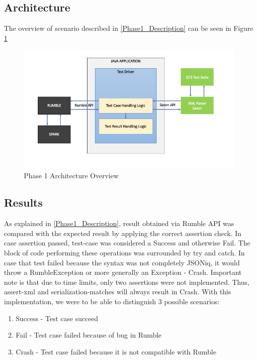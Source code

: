 \subsection{Architecture}
The overview of scenario described in \ref{Phase1_Description} can be seen in Figure \ref{fig:Phase1_Architecture}
 \begin{figure}[h!]
 	\vspace*{-5mm}
 	\includegraphics[width=\linewidth]{architecture_diagram_phase_1.jpeg}
 	\vspace*{-15mm}
 	\caption{Phase 1 Architecture Overview}
 	\label{fig:Phase1_Architecture}
 \end{figure}

\vspace*{-5mm}
\subsection{Results}

\label{Phase1_Results}
As explained in \ref{Phase1_Description}, result obtained via Rumble API was compared with the expected result by applying the correct assertion check. In case assertion passed, test-case was considered a Success and otherwise Fail. The block of code performing these operations was surrounded by try and catch. In case that test failed because the syntax was not completely JSONiq, it would throw a RumbleException or more generally an Exception - Crash. Important note is that due to time limits, only two assertions were not implemented. Thus, assert-xml and serialization-matches will always result in Crash. With this implementation, we were to be able to distinguish 3 possible scenarios:

\begin{enumerate}
	\item Success - Test case succeed
	\item Fail - Test case failed because of bug in Rumble
	\item Crash - Test case failed because it is not compatible with Rumble
\end{enumerate}

